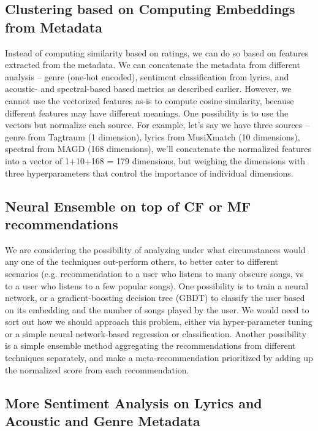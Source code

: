 \documentclass[conference]{IEEEtran}
\begin{document}
\subsection{Clustering based on Computing Embeddings from Metadata}

Instead of computing similarity based on ratings, we can do so based on features extracted from the metadata. We can concatenate the metadata from different analysis – genre (one-hot encoded), sentiment classification from lyrics, and acoustic- and spectral-based based metrics as described earlier. However, we cannot use the vectorized features as-is to compute cosine similarity, because different features may have different meanings. One possibility is to use the vectors but normalize each source. For example, let’s say we have three sources – genre from Tagtraum (1 dimension), lyrics from MusiXmatch (10 dimensions), spectral from MAGD (168 dimensions), we’ll concatenate the normalized features into a vector of 1+10+168 = 179 dimensions, but weighing the dimensions with three hyperparameters that control the importance of individual dimensions.

\subsection{
Neural Ensemble on top of CF or MF recommendations}

We are considering the possibility of analyzing under what circumstances would any one of the techniques out-perform others, to better cater to different scenarios (e.g. recommendation to a user who listens to many obscure songs, vs to a user who listens to a few popular songs). One possibility is to train a neural network, or a gradient-boosting decision tree (GBDT) to classify the user based on its embedding and the number of songs played by the user. We would need to sort out how we should approach this problem, either via hyper-parameter tuning or a simple neural network-based regression or classification. Another possibility is a simple ensemble method aggregating the recommendations from different techniques separately, and make a meta-recommendation prioritized by adding up the normalized score from each recommendation.

\subsection{More Sentiment Analysis on Lyrics and Acoustic and Genre Metadata}
\end{document}
